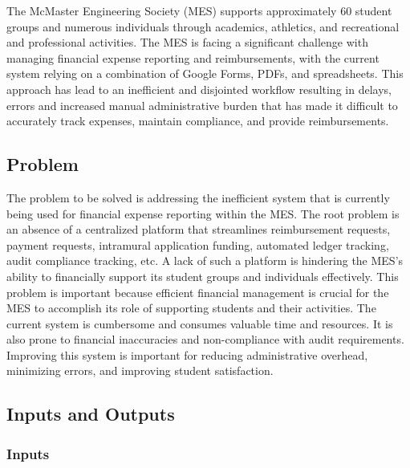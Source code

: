 \documentclass{article}
\begin{document}


The McMaster Engineering Society (MES) supports approximately 60 student groups and numerous individuals through academics, athletics, and recreational and professional activities. The MES is facing a significant challenge with managing financial expense reporting and reimbursements, with the current system relying on a combination of Google Forms, PDFs, and spreadsheets. This approach has lead to an inefficient and disjointed workflow resulting in delays, errors and increased manual administrative burden that has made it difficult to accurately track expenses, maintain compliance, and provide reimbursements. 

\subsection{Problem}

The problem to be solved is addressing the inefficient system that is currently being used for financial expense reporting within the MES. The root problem is an absence of a centralized platform that streamlines reimbursement requests, payment requests, intramural application funding, automated ledger tracking, audit compliance tracking, etc. A lack of such a platform is hindering the MES's ability to financially support its student groups and individuals effectively. This problem is important because efficient financial management is crucial for the MES to accomplish its role of supporting students and their activities. The current system is cumbersome and consumes valuable time and resources. It is also prone to financial inaccuracies and non-compliance with audit requirements. Improving this system is important for reducing administrative overhead, minimizing errors, and improving student satisfaction.

\subsection{Inputs and Outputs}


\subsubsection{Inputs}
\end{document}
